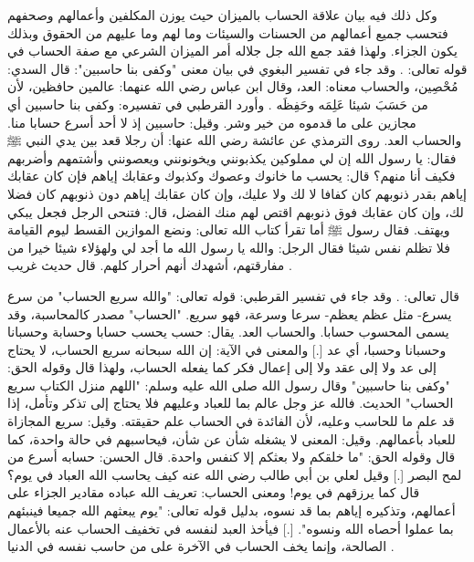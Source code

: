 وكل ذلك فيه بيان علاقة الحساب بالميزان حيث يوزن المكلفين وأعمالهم وصحفهم فتحسب جميع أعمالهم من الحسنات والسيئات وما لهم وما عليهم من الحقوق وبذلك يكون الجزاء. ولهذا فقد جمع الله جل جلاله أمر الميزان الشرعي مع صفة الحساب في قوله تعالى: \quranayah*[21][47]{\footnotesize \surahname*[21]}. وقد جاء في تفسير البغوي في بيان معنى "وكفى بنا حاسبين": قال السدي: مُحْصِين، والحساب معناه: العد، وقال ابن عباس رضي الله عنهما: عالمين حافظين، لأن من حَسَبَ شيئا عَلِمَه وحَفِظَه \href{https://shamela.ws/book/41/1999#p2}{\faExternalLink} \cite{tafsir_Baghawi}. وأورد القرطبي في تفسيره: وكفى بنا حاسبين أي مجازين على ما قدموه من خير وشر. وقيل: حاسبين إذ لا أحد أسرع حسابا منا. والحساب العد. روى الترمذي عن عائشة رضي الله عنها: أن رجلا قعد بين يدي النبي ﷺ فقال: يا رسول الله إن لي مملوكين يكذبونني ويخونونني ويعصونني وأشتمهم وأضربهم فكيف أنا منهم؟ قال: يحسب ما خانوك وعصوك وكذبوك وعقابك إياهم فإن كان عقابك إياهم بقدر ذنوبهم كان كفافا لا لك ولا عليك، وإن كان عقابك إياهم دون ذنوبهم كان فضلا لك، وإن كان عقابك فوق ذنوبهم اقتص لهم منك الفضل، قال: فتنحى الرجل فجعل يبكي ويهتف. فقال رسول ﷺ أما تقرأ كتاب الله تعالى: ونضع الموازين القسط ليوم القيامة فلا تظلم نفس شيئا فقال الرجل: والله يا رسول الله ما أجد لي ولهؤلاء شيئا خيرا من مفارقتهم، أشهدك أنهم أحرار كلهم. قال حديث غريب \href{https://shamela.ws/book/20855/4433#p1}{\faExternalLink} \cite{tafsir_Qurtubi}.

قال تعالى: \quranayah*[2][202]{\footnotesize \surahname*[2]}. وقد جاء في تفسير القرطبي: قوله تعالى: "والله سريع الحساب" من سرع يسرع- مثل عظم يعظم- سرعا وسرعة، فهو سريع. "الحساب" مصدر كالمحاسبة، وقد يسمى المحسوب حسابا. والحساب العد. يقال: حسب يحسب حسابا وحسابة وحسبانا وحسبانا وحسبا، أي عد [.] والمعنى في الآية: إن الله سبحانه سريع الحساب، لا يحتاج إلى عد ولا إلى عقد ولا إلى إعمال فكر كما يفعله الحساب، ولهذا قال وقوله الحق: "وكفى بنا حاسبين" وقال رسول الله صلى الله عليه وسلم: "اللهم منزل الكتاب سريع الحساب" الحديث. فالله عز وجل عالم بما للعباد وعليهم فلا يحتاج إلى تذكر وتأمل، إذا قد علم ما للحاسب وعليه، لأن الفائدة في الحساب علم حقيقته. وقيل: سريع المجازاة للعباد بأعمالهم. وقيل: المعنى لا يشغله شأن عن شأن، فيحاسبهم في حالة واحدة، كما قال وقوله الحق: "ما خلقكم ولا بعثكم إلا كنفس واحدة. قال الحسن: حسابه أسرع من لمح البصر [.] وقيل لعلي بن أبي طالب رضي الله عنه كيف يحاسب الله العباد في يوم؟ قال كما يرزقهم في يوم! ومعنى الحساب: تعريف الله عباده مقادير الجزاء على أعمالهم، وتذكيره إياهم بما قد نسوه، بدليل قوله تعالى: "يوم يبعثهم الله جميعا فينبئهم بما عملوا أحصاه الله ونسوه". [.] فيأخذ العبد لنفسه في تخفيف الحساب عنه بالأعمال الصالحة، وإنما يخف الحساب في الآخرة على من حاسب نفسه في الدنيا \href{https://shamela.ws/book/20855/906#p4}{\faExternalLink} \cite{tafsir_Qurtubi}.

